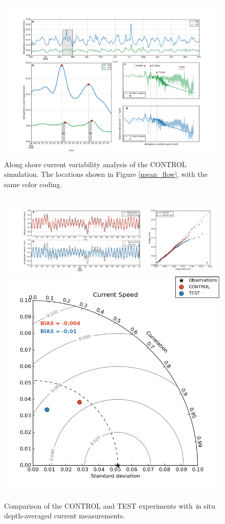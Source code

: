 \documentclass[final]{beamer}
\newlength{\onecolwid}
\newlength{\twocolwid}
\begin{document}
\begin{frame}[t]
\begin{columns}[t]
\begin{column}{\twocolwid}
\begin{columns}[t,totalwidth=\twocolwid]
\begin{column}{\onecolwid}
\begin{block}
            \begin{figure}
            \includegraphics[width=1.0\linewidth]{pb-sc_5day-lowpass_time-series.png}
            \caption{\label{spectra} Along shore current variability analysis of the CONTROL simulation. The locations shown in Figure \ref{mean_flow}, with the same color coding. }
            \end{figure}

            \end{block}


        \end{column} %

    \end{columns} %

    \begin{block}

    \begin{figure}
    \includegraphics[width=0.76\linewidth]{validation.png}
    \includegraphics[width=0.24\linewidth]{taylor.png}
    \caption{\label{validation} Comparison of the CONTROL and TEST experiments with {\textit in situ} depth-averaged current measurements.}
    \end{figure}


\end{block}
\end{column}
\end{columns}
\end{frame}
\end{document}
